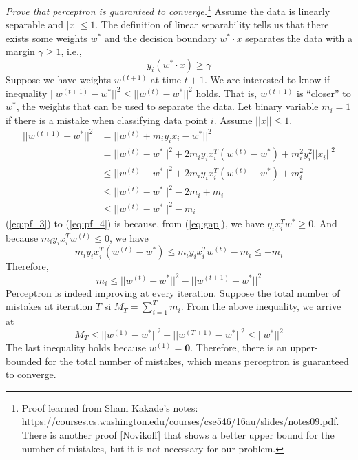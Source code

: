 \documentclass[12pt]{article}
\theoremstyle{definition}
\begin{document}
\emph{Prove that perceptron is guaranteed to converge.}\footnote{Proof learned from Sham Kakade's notes: \url{https://courses.cs.washington.edu/courses/cse546/16au/slides/notes09.pdf}. There is another proof [Novikoff] that shows a better upper bound for the number of mistakes, but it is not necessary for our problem.} Assume the data is linearly separable and $|x|\leq 1$. The definition of linear separability tells us that there exists some weights $w^*$ and the decision boundary $w^*\cdot x$ separates the data with a margin $\gamma\geq 1$, i.e.,
\begin{equation}\label{eq:gap}
  y_i(w^*\cdot x)\geq \gamma
\end{equation}
Suppose we have weights $w^{(t+1)}$ at time $t+1$. We are interested to know if inequality $||w^{(t+1)}-w^*||^2\leq||w^{(t)}-w^*||^2$ holds. That is, $w^{(t+1)}$ is ``closer'' to $w^*$, the weights that can be used to separate the data. Let binary variable $m_i=1$ if there is a mistake when classifying data point $i$. Assume $||x||\leq 1$.
\begin{align}
  ||w^{(t+1)}-w^*||^2&=||w^{(t)}+m_iy_ix_i-w^*||^2\\
  &=||w^{(t)}-w^*||^2+2m_iy_ix_i^T(w^{(t)}-w^*)+m_i^2y_i^2||x_i||^2\\
  \label{eq:pf_3}&\leq ||w^{(t)}-w^*||^2+2m_iy_ix_i^T(w^{(t)}-w^*)+m_i^2\\
  \label{eq:pf_4}&\leq ||w^{(t)}-w^*||^2-2m_i+m_i\\
  &\leq ||w^{(t)}-w^*||^2-m_i
\end{align}
(\ref{eq:pf_3}) to (\ref{eq:pf_4}) is because, from (\ref{eq:gap}), we have $y_ix_i^Tw^*\geq 0$. And because $m_iy_ix_i^Tw^{(t)}\leq 0$, we have
\begin{equation}
  m_iy_ix_i^T(w^{(t)}-w^*)\leq m_iy_ix_i^Tw^{(t)}-m_i\leq -m_i
\end{equation}
Therefore,
\begin{equation}
  m_i\leq||w^{(t)}-w^*||^2-||w^{(t+1)}-w^*||^2
\end{equation}
Perceptron is indeed improving at every iteration. Suppose the total number of mistakes at iteration $T$ si $M_T=\sum_{i=1}^Tm_i$. From the above inequality, we arrive at
\begin{equation}
  M_T\leq||w^{(1)}-w^*||^2-||w^{(T+1)}-w^*||^2\leq ||w^*||^2
\end{equation}
The last inequality holds because $w^{(1)}=\bm{0}$. Therefore, there is an upper-bounded for the total number of mistakes, which means perceptron is guaranteed to converge.
\end{document}
